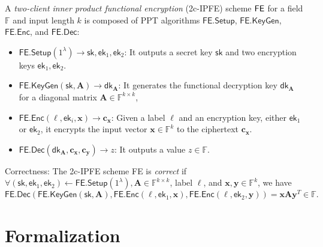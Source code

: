 \begin{definition}
\label{def:2c-IPFE}
	A \emph{two-client inner product functional encryption} (2c-IPFE) scheme $\sf FE$ for a field $\mathbb{F}$ and input length $k$ is composed of PPT algorithms $\textsf{FE.Setup}$, $\textsf{FE.KeyGen}$, $\textsf{FE.Enc}$, and $\textsf{FE.Dec}$:

	\begin{itemize}
	
		\item $\textsf{FE.Setup}(1^\lambda) \to \textsf{sk}, \textsf{ek}_1, \textsf{ek}_2$: It outputs a secret key $\textsf{sk}$ and two encryption keys $\textsf{ek}_1, \textsf{ek}_2$.
	
		\item $\textsf{FE.KeyGen}(\textsf{sk}, \mathbf{A}) \to \textsf{dk}_\mathbf{A}$: It generates the functional decryption key $\textsf{dk}_\mathbf{A}$ for a diagonal matrix $\mathbf{A} \in \mathbb{F}^{k \times k}$,  
	
		\item $\textsf{FE.Enc}(\ell, \textsf{ek}_i, \mathbf{x}) \to \mathbf{c_x}$: Given a label $\ell$ and an encryption key, either $\textsf{ek}_1$ or $\textsf{ek}_2$, it encrypts the input vector $\mathbf{x} \in \mathbb{F}^k$ to the ciphertext $\mathbf{c_x}$. 
	
		\item $\textsf{FE.Dec}(\textsf{dk}_\mathbf{A}, \mathbf{c_x}, \mathbf{c_y}) \to z$: It outputs a value $z \in \mathbb{F}$.
	
	\end{itemize}
	
	\noindent Correctness: The 2c-IPFE scheme \textsf{FE} is \emph{correct} if $\forall (\textsf{sk}, \textsf{ek}_1, \textsf{ek}_2) \gets \textsf{FE.Setup}(1^\lambda), \mathbf{A} \in \mathbb{F}^{k \times k}$, label $\ell$, and $ \mathbf{x}, \mathbf{y} \in \mathbb{F}^k$, we have
	\[
		\textsf{FE.Dec}(\textsf{FE.KeyGen}(\textsf{sk},  \mathbf{A}), \textsf{FE.Enc}(\ell, \textsf{ek}_1, \mathbf{x}), \textsf{FE.Enc}(\ell, \textsf{ek}_2, \mathbf{y}) ) = \mathbf{x} \mathbf{A} \mathbf{y}^T \in \mathbb{F}.
	\]

\end{definition}




\section{Formalization}
\label{sec:formalization}


